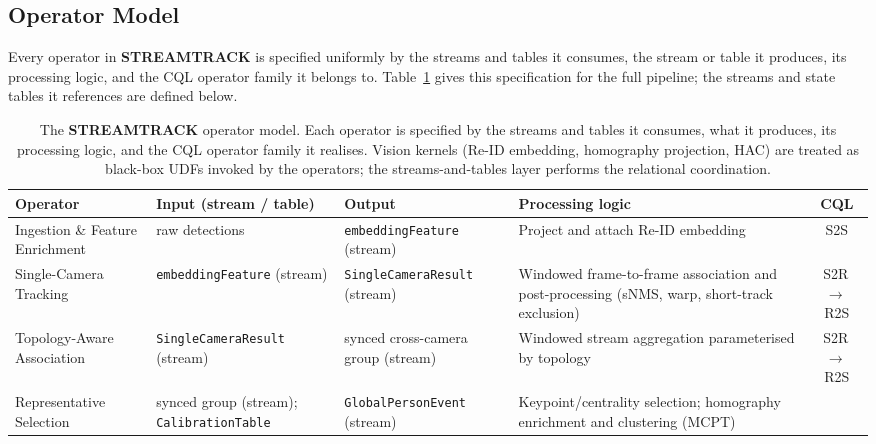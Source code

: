 \documentclass[review]{elsarticle}
\begin{document}
\subsection{Operator Model}
\label{sec:overview:operatormodel}
Every operator in \textbf{STREAMTRACK} is specified uniformly by the streams and tables it consumes, the stream or table it produces, its processing logic, and the CQL operator
family it belongs to. Table~\ref{tab:operatormodel} gives this specification for the full pipeline; the streams and state tables it references are defined below.%

\begin{table}[tbh!]
    \centering
    \caption{The \textbf{STREAMTRACK} operator model. Each operator is specified by the streams and tables it consumes, what it produces, its processing logic, and the CQL operator family it realises. Vision kernels (Re-ID embedding, homography projection, HAC) are treated as black-box UDFs invoked by the operators; the streams-and-tables layer performs the relational
    coordination.}
    \label{tab:operatormodel}
    \small
    \setlength{\tabcolsep}{4pt}
    \renewcommand{\arraystretch}{1.25}
    \begin{tabularx}{\textwidth}{@{} l X X X c @{}}
        \toprule
        \textbf{Operator} & \textbf{Input (stream / table)} & \textbf{Output} & \textbf{Processing logic} & \textbf{CQL} \\
        \midrule
        Ingestion \& Feature Enrichment
            & raw detections
            & \texttt{embeddingFeature} (stream)
            & Project and attach Re-ID embedding
            & S2S \\
        \addlinespace
        Single-Camera Tracking
            & \texttt{embeddingFeature} (stream)
            & \texttt{SingleCameraResult} (stream)
            & Windowed frame-to-frame association and post-processing (sNMS, warp, short-track exclusion)
            & S2R\,$\to$\,R2S \\
        \addlinespace
        Topology-Aware Association
            & \texttt{SingleCameraResult} (stream)
            & synced cross-camera group (stream)
            & Windowed stream aggregation parameterised by topology
            & S2R\,$\to$\,R2S \\
        \addlinespace
        Representative Selection
            & synced group (stream); \texttt{CalibrationTable}
            & \texttt{GlobalPersonEvent} (stream)
            & Keypoint/centrality selection; homography enrichment and clustering (MCPT)

\end{tabularx}
\end{table}
\end{document}
